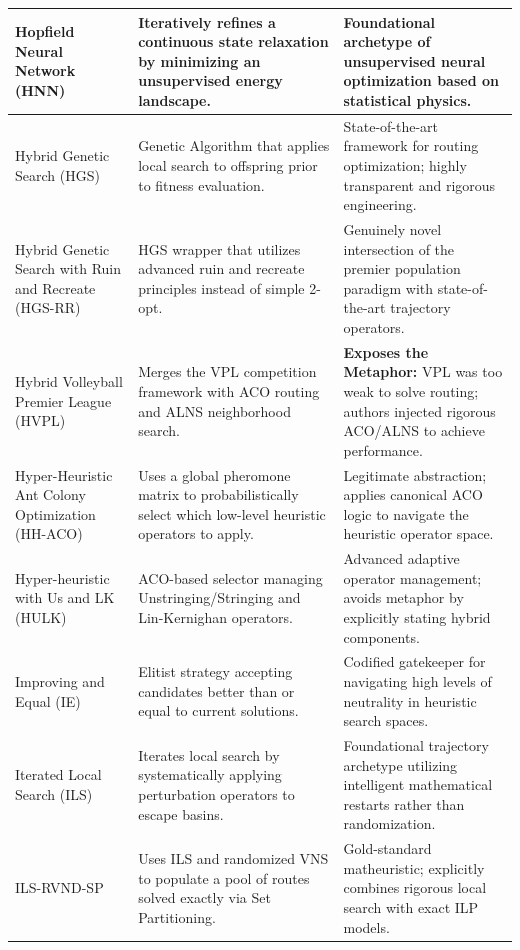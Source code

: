 \begin{center}
\begin{longtable}{
  >{\raggedright\arraybackslash}p{}
  >{\raggedright\arraybackslash}p{}
  >{\raggedright\arraybackslash}p{}
}
Hopfield Neural Network (HNN) & Iteratively refines a continuous state relaxation by minimizing an unsupervised energy landscape. & Foundational archetype of unsupervised neural optimization based on statistical physics. \\ \midrule

Hybrid Genetic Search (HGS) & Genetic Algorithm that applies local search to offspring prior to fitness evaluation. & State-of-the-art framework for routing optimization; highly transparent and rigorous engineering. \\ \midrule

Hybrid Genetic Search with Ruin and Recreate (HGS-RR) & HGS wrapper that utilizes advanced ruin and recreate principles instead of simple 2-opt. & Genuinely novel intersection of the premier population paradigm with state-of-the-art trajectory operators. \\ \midrule

Hybrid Volleyball Premier League (HVPL) & Merges the VPL competition framework with ACO routing and ALNS neighborhood search. & \textbf{Exposes the Metaphor:} VPL was too weak to solve routing; authors injected rigorous ACO/ALNS to achieve performance. \\ \midrule

Hyper-Heuristic Ant Colony Optimization (HH-ACO) & Uses a global pheromone matrix to probabilistically select which low-level heuristic operators to apply. & Legitimate abstraction; applies canonical ACO logic to navigate the heuristic operator space. \\ \midrule

Hyper-heuristic with Us and LK (HULK) & ACO-based selector managing Unstringing/Stringing and Lin-Kernighan operators. & Advanced adaptive operator management; avoids metaphor by explicitly stating hybrid components. \\ \midrule

Improving and Equal (IE) & Elitist strategy accepting candidates better than or equal to current solutions. & Codified gatekeeper for navigating high levels of neutrality in heuristic search spaces. \\ \midrule

Iterated Local Search (ILS) & Iterates local search by systematically applying perturbation operators to escape basins. & Foundational trajectory archetype utilizing intelligent mathematical restarts rather than randomization. \\ \midrule

ILS-RVND-SP & Uses ILS and randomized VNS to populate a pool of routes solved exactly via Set Partitioning. & Gold-standard matheuristic; explicitly combines rigorous local search with exact ILP models. \\ \midrule


\end{longtable}
\end{center}
